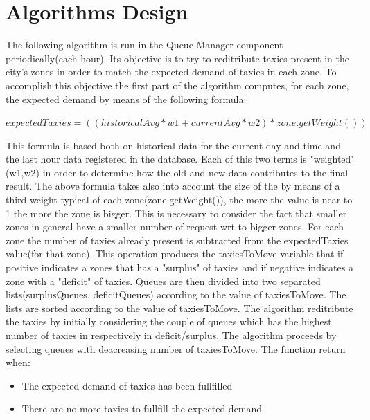 \documentclass[11pt,titlepage]{article} %
\begin{document}
\newpage

\section{Algorithms Design}
The following algorithm is run in the Queue Manager component periodically(each hour).
  Its objective is to try to reditribute taxies present in the city's zones in order
  to match the expected demand of taxies in each zone.
  To accomplish this objective the first part of the algorithm computes, for each zone,
  the expected demand by means of the following formula:\newline

    $ expectedTaxies = ((historicalAvg*w1+currentAvg*w2)*zone.getWeight()) $\newline

  This formula is based both on historical data for the current day and time and
  the last hour data registered in the database.
  Each of this two terms is "weighted" (w1,w2) in order to determine how
  the old and new data contributes to the final result.
  The above formula takes also into account the size of the by means of a third
  weight typical of each zone(zone.getWeight()), the more the value is near to 1
  the more the zone is bigger. This is necessary to consider the fact that smaller
  zones in general have a smaller number of request wrt to bigger zones.
  For each zone the number of taxies already present is subtracted from the
  expectedTaxies value(for that zone). This operation produces the taxiesToMove
  variable that if positive indicates a zones that has a "surplus" of taxies and
  if negative indicates a zone with a "deficit" of taxies.
  Queues are then divided into two separated lists(surplusQueues, deficitQueues)
  according to the value of taxiesToMove.
  The lists are sorted according to the value of taxiesToMove.
  The algorithm reditribute the taxies by initially considering the couple of queues which
  has the highest number of taxies in respectively in deficit/surplus.
  The algorithm proceeds by selecting queues with deacreasing number of taxiesToMove.
  The function return when:
\begin{itemize}
    \item The expected demand of taxies has been fullfilled
    \item There are no more taxies to fullfill the expected demand
\end{itemize}
\end{document}
